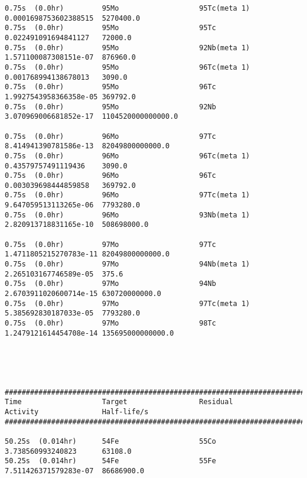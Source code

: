 \begin{lstlisting}[style=sOutputFile,caption={Final results for steel irradiation},label={listing:alexsteel}]
0.75s  (0.0hr)         95Mo                   95Tc(meta 1)           0.0001698753602388515  5270400.0             
0.75s  (0.0hr)         95Mo                   95Tc                   0.022491091694841127   72000.0               
0.75s  (0.0hr)         95Mo                   92Nb(meta 1)           1.571100087308151e-07  876960.0              
0.75s  (0.0hr)         95Mo                   96Tc(meta 1)           0.001768994138678013   3090.0                
0.75s  (0.0hr)         95Mo                   96Tc                   1.9927543958366358e-05 369792.0              
0.75s  (0.0hr)         95Mo                   92Nb                   3.070969006681852e-17  1104520000000000.0    

0.75s  (0.0hr)         96Mo                   97Tc                   8.414941390781586e-13  82049800000000.0      
0.75s  (0.0hr)         96Mo                   96Tc(meta 1)           0.43579757491119436    3090.0                
0.75s  (0.0hr)         96Mo                   96Tc                   0.003039698444859858   369792.0              
0.75s  (0.0hr)         96Mo                   97Tc(meta 1)           9.647059513113265e-06  7793280.0             
0.75s  (0.0hr)         96Mo                   93Nb(meta 1)           2.820913718831165e-10  508698000.0           

0.75s  (0.0hr)         97Mo                   97Tc                   1.4711805215270783e-11 82049800000000.0      
0.75s  (0.0hr)         97Mo                   94Nb(meta 1)           2.265103167746589e-05  375.6                 
0.75s  (0.0hr)         97Mo                   94Nb                   2.6703911020600714e-15 630720000000.0        
0.75s  (0.0hr)         97Mo                   97Tc(meta 1)           5.385692830187033e-05  7793280.0             
0.75s  (0.0hr)         97Mo                   98Tc                   1.2479121614454708e-14 135695000000000.0     





####################################################################################################################
Time                   Target                 Residual               Activity               Half-life/s            
####################################################################################################################

50.25s  (0.014hr)      54Fe                   55Co                   3.738560993240823      63108.0               
50.25s  (0.014hr)      54Fe                   55Fe                   7.511426371579283e-07  86686900.0            


\end{lstlisting}
